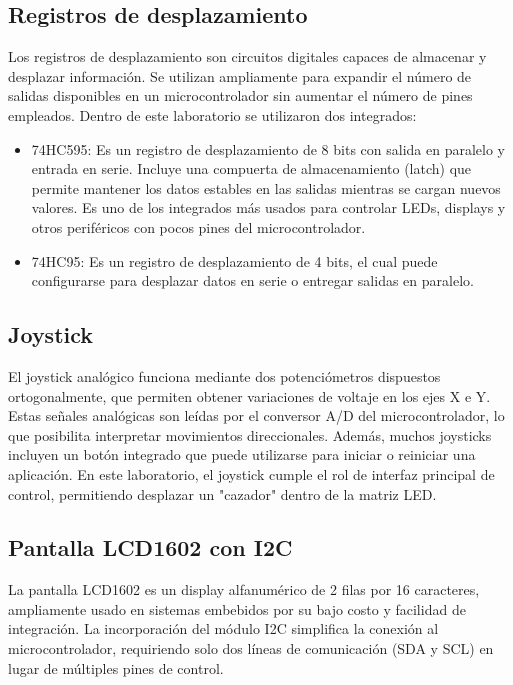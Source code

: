 \subsection{Registros de desplazamiento}

Los registros de desplazamiento son circuitos digitales capaces de almacenar y desplazar información. Se
utilizan ampliamente para expandir el número de salidas disponibles en un microcontrolador sin aumentar el
número de pines empleados. Dentro de este laboratorio se utilizaron dos integrados:
\begin{itemize}
    \item 74HC595: Es un registro de desplazamiento de 8 bits con salida en paralelo y entrada en serie. Incluye
    una compuerta de almacenamiento (latch) que permite mantener los datos estables en las salidas
    mientras se cargan nuevos valores. Es uno de los integrados más usados para controlar LEDs, displays y otros periféricos con pocos pines del microcontrolador.
    \item 74HC95: Es un registro de desplazamiento de 4 bits, el cual puede configurarse para desplazar datos en
    serie o entregar salidas en paralelo.
\end{itemize}

\subsection{Joystick}

El joystick analógico funciona mediante dos potenciómetros dispuestos ortogonalmente, que permiten
obtener variaciones de voltaje en los ejes X e Y. Estas señales analógicas son leídas por el conversor A/D del
microcontrolador, lo que posibilita interpretar movimientos direccionales. Además, muchos joysticks
incluyen un botón integrado que puede utilizarse para iniciar o reiniciar una aplicación. En este laboratorio,
el joystick cumple el rol de interfaz principal de control, permitiendo desplazar un "cazador" dentro de la matriz LED.

\subsection{Pantalla LCD1602 con I2C}
La pantalla LCD1602 es un display alfanumérico de 2 filas por 16 caracteres, ampliamente usado en sistemas embebidos por su bajo costo y 
facilidad de integración. La incorporación del módulo I2C simplifica la conexión al microcontrolador, requiriendo solo dos líneas de
comunicación (SDA y SCL) en lugar de múltiples pines de control.
